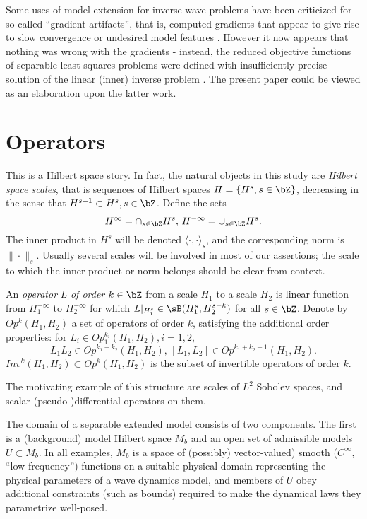 Some uses of model extension for inverse wave problems have been
criticized for so-called ``gradient artifacts'', that is, computed
gradients that appear to give rise to slow convergence or undesired
model features \cite[]{FeiWilliamson:10,VyasTang:10}. However it now
appears that nothing was wrong with the gradients - instead, the
reduced objective functions of separable least squares problems were
defined with insufficiently precise solution of the linear (inner)
inverse problem \cite[]{KerSy:94,LiuSymesLi:14,ChaurisGP:14}. The present paper
could be viewed as an elaboration upon the latter work.

\section{Operators}
This is a Hilbert space story. 
In fact, the natural objects in this study are {\em Hilbert space scales}, that
is sequences of Hilbert spaces $H = \{ H^s, s \in \bZ\}$, decreasing in
the sense that
$H^{s+1} \subset H^s, s \in \bZ$. Define the sets
\[
H^{\infty} = \cap_{s \in \bZ} H^s, \,H^{-\infty} = \cup_{s \in
  \bZ}H^s.
\]
The inner 
product in $H^s$ will be denoted $\langle \cdot, \cdot \rangle_s$, and
the corresponding norm is
$\| \cdot \|_s$. Usually several scales will be involved in most of
our assertions; the scale to which the inner product or norm belongs
should be clear from context.

An {\em operator} $L$  {\em of order $k \in \bZ$} from
a scale $H_1$ to a scale $H_2$ is linear function from $H_1^{-\infty}$ to
$H_2^{-\infty}$ for which $L|_{H_1^s} \in \sB(H_1^s,H_2^{s-k})$ for
all $ s \in
\bZ$. Denote by $Op^k(H_1,H_2)$ a set of operators of order $k$,
satisfying the additional order properties: for $L_i \in
Op^{k_i}_1(H_1,H_2), i=1,2$,
\begin{equation}
\label{eqn:comm}
L_1 L_2 \in Op^{k_1+k_2}(H_1,H_2),\,[L_1,L_2] \in
Op^{k_1+k_2-1}(H_1,H_2).
\end{equation}
$Inv^k(H_1,H_2) \subset Op^k(H_1,H_2)$ is the subset of invertible
operators of order $k$.

The motivating example of this structure are scales of $L^2$ Sobolev
spaces, and scalar (pseudo-)\-differential operators on them.

The domain of a separable extended model consists of two
components. The first is a (background) model Hilbert space $M_b$ and
an open set of admissible models
$U \subset M_b$. In all examples, $M_b$ is a space of (possibly)
vector-valued) smooth ($C^{\infty}$, ``low frequency'') functions on a suitable physical
domain representing the physical parameters of a wave dynamics model, and members of $U$ obey additional constraints (such as
bounds) required to make the dynamical laws they parametrize
well-posed. 

